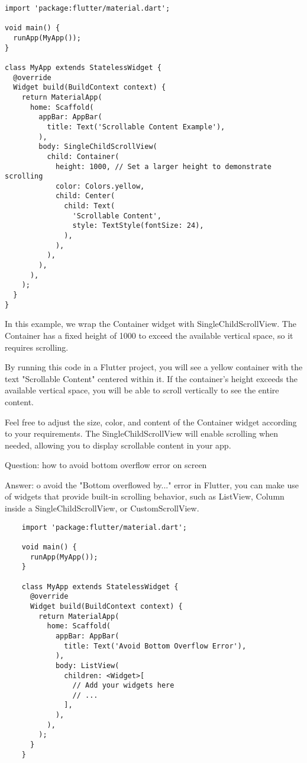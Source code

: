 \begin{lstlisting}
import 'package:flutter/material.dart';

void main() {
  runApp(MyApp());
}

class MyApp extends StatelessWidget {
  @override
  Widget build(BuildContext context) {
    return MaterialApp(
      home: Scaffold(
        appBar: AppBar(
          title: Text('Scrollable Content Example'),
        ),
        body: SingleChildScrollView(
          child: Container(
            height: 1000, // Set a larger height to demonstrate scrolling
            color: Colors.yellow,
            child: Center(
              child: Text(
                'Scrollable Content',
                style: TextStyle(fontSize: 24),
              ),
            ),
          ),
        ),
      ),
    );
  }
}
\end{lstlisting}

In this example, we wrap the Container widget with SingleChildScrollView. The Container has a fixed height of 1000 to 
exceed the available vertical space, so it requires scrolling.

By running this code in a Flutter project, you will see a yellow container with the text "Scrollable Content" 
centered within it. If the container's height exceeds the available vertical space, you will be able to scroll 
vertically to see the entire content.

Feel free to adjust the size, color, and content of the Container widget according to your requirements. The 
SingleChildScrollView will enable scrolling when needed, allowing you to display scrollable content in your app.

Question: how to avoid bottom overflow error on screen

Answer: o avoid the "Bottom overflowed by..." error in Flutter, you can make use of widgets that provide built-in 
scrolling behavior, such as ListView, Column inside a SingleChildScrollView, or CustomScrollView.

\begin{lstlisting}
    import 'package:flutter/material.dart';

    void main() {
      runApp(MyApp());
    }
    
    class MyApp extends StatelessWidget {
      @override
      Widget build(BuildContext context) {
        return MaterialApp(
          home: Scaffold(
            appBar: AppBar(
              title: Text('Avoid Bottom Overflow Error'),
            ),
            body: ListView(
              children: <Widget>[
                // Add your widgets here
                // ...
              ],
            ),
          ),
        );
      }
    }    
\end{lstlisting}

